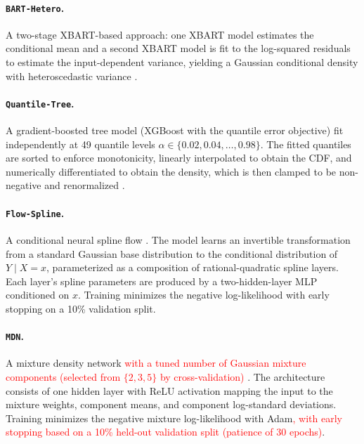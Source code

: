 \documentclass{article}
\newcommand{\method}[1]{\texttt{#1}}
\begin{document}
\paragraph{\method{BART-Hetero}.}
A two-stage XBART-based approach: one XBART model estimates the conditional
mean and a second XBART model is fit to the log-squared residuals to estimate
the input-dependent variance, yielding a Gaussian conditional density with
heteroscedastic variance \citep{chipman2010bart,he2019xbart}.

\paragraph{\method{Quantile-Tree}.}
A gradient-boosted tree model (XGBoost with the quantile error objective) fit
independently at 49 quantile levels
$\alpha\in\{0.02,0.04,\ldots,0.98\}$. The fitted quantiles are sorted to
enforce monotonicity, linearly interpolated to obtain the CDF, and
numerically differentiated to obtain the density, which is then clamped to be
non-negative and renormalized
\citep{koenker1978regression,meinshausen2006quantile,chen2016xgboost}.

\paragraph{\method{Flow-Spline}.}
A conditional neural spline flow \citep{durkan2019nsf,papamakarios2021normalizing}.
The model learns an invertible transformation from a standard Gaussian base
distribution to the conditional distribution of $Y\mid X=x$, parameterized as
a composition of rational-quadratic spline layers. Each layer's spline
parameters are produced by a two-hidden-layer MLP conditioned on $x$. Training
minimizes the negative log-likelihood with early stopping on a 10\% validation
split.

\paragraph{\method{MDN}.}
A mixture density network \textcolor{red}{with a tuned number of Gaussian mixture components (selected from $\{2,3,5\}$ by cross-validation)}
\citep{bishop1994mixture}. The architecture consists of one hidden layer with
ReLU activation mapping the input to the mixture weights, component means, and
component log-standard deviations. Training minimizes the negative mixture
log-likelihood with Adam\textcolor{red}{, with early stopping based on a 10\% held-out validation split (patience of 30 epochs)}.
\end{document}
